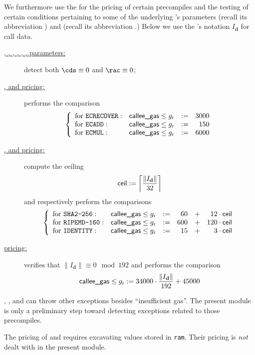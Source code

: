 We furthermore use the \oobMod{} for the pricing of certain precompiles and the testing of certain conditions pertaining to some of the underlying 's parameters
\CDS{} (recall its abbreviation \cds{}) and
\RAC{} (recall its abbreviation \rac{}.)
\saNote{} Below we use the \cite{EYP-London}'s notation $I_\textbf{d}$ for call data.
\begin{description}
	\item[\underline{, , , , , ,  parameters:}]
		detect both $\cds \equiv 0$ and $\rac \equiv 0$; 
	\item[\underline{,  and  pricing:}]
		performs the comparison
		\[
			\left\{ \begin{array}{llcrcl}
				\text{for }\texttt{ECRECOVER}   : & \textsf{callee\_gas} \leq g_\text{r} & := & 3000 \\
				\text{for }\texttt{ECADD}       : & \textsf{callee\_gas} \leq g_\text{r} & := &  150 \\
				\text{for }\texttt{ECMUL}       : & \textsf{callee\_gas} \leq g_\text{r} & := & 6000 \\
			\end{array} \right.
		\]
	\item[\underline{,  and  pricing:}]
		compute the ceiling
		\[ \textsf{ceil} := \left \lceil \frac{\| I_\textbf{d} \|}{32} \right \rceil \]
		and respectively perform the comparisons
		\[
			\left\{ \begin{array}{llcrcr}
				\text{for }\texttt{SHA2-256}   : & \textsf{callee\_gas} \leq g_\text{r} & := & 60  & + & 12  \cdot \textsf{ceil}  \\
				\text{for }\texttt{RIPEMD-160} : & \textsf{callee\_gas} \leq g_\text{r} & := & 600 & + & 120 \cdot \textsf{ceil}  \\
				\text{for }\texttt{IDENTITY}   : & \textsf{callee\_gas} \leq g_\text{r} & := & 15  & + & 3   \cdot \textsf{ceil}  \\
			\end{array} \right.
		\]
	\item[\underline{ pricing:}]
		verifies that $\| I_\textbf{d} \| \equiv 0 \mod 192$ and performs the comparison 
		\[ \textsf{callee\_gas} \leq g_\text{r} := 34000 \cdot \frac{\| I_\textbf{d} \|}{192} + 45000 \]
\end{description}

\saNote{}
, ,  and  can throw other exceptions besides ``insufficient gas''.
The present module is only a preliminary step toward detecting exceptions related to those precompiles.

\saNote{} The pricing of  and  requires excavating values stored in \texttt{ram}. Their pricing is \emph{not} dealt with in the present module. 

